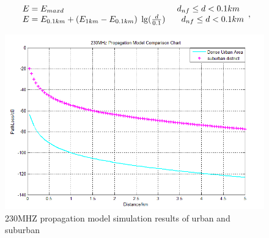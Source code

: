 \documentclass[12pt,a4paper,twocolumn,fleqn]{narms}
\begin{document}
{\begin{equation}
\begin{array}{l}
E = {E_{maxd}}{\kern 1pt} {\kern 1pt} {\kern 1pt} {\kern 1pt} {\kern 1pt} {\kern 1pt} {\kern 1pt} {\kern 1pt} {\kern 1pt} {\kern 1pt} {\kern 1pt} {\kern 1pt} {\kern 1pt} {\kern 1pt} {\kern 1pt} {\kern 1pt} {\kern 1pt} {\kern 1pt} {\kern 1pt} {\kern 1pt} {\kern 1pt} {\kern 1pt} {\kern 1pt} {\kern 1pt} {\kern 1pt} {\kern 1pt} {\kern 1pt} {\kern 1pt} {\kern 1pt} {\kern 1pt} {\kern 1pt} {\kern 1pt} {\kern 1pt} {\kern 1pt} {\kern 1pt} {\kern 1pt} {\kern 1pt} {\kern 1pt} {\kern 1pt} {\kern 1pt} {\kern 1pt} {\kern 1pt} {\kern 1pt} {\kern 1pt} {\kern 1pt} {\kern 1pt} {\kern 1pt} {\kern 1pt} {\kern 1pt} {\kern 1pt} {\kern 1pt} {\kern 1pt} {\kern 1pt} {\kern 1pt} {\kern 1pt} {\kern 1pt} {\kern 1pt} {\kern 1pt} {\kern 1pt} {\kern 1pt} {\kern 1pt} {\kern 1pt} {\kern 1pt} {\kern 1pt} {\kern 1pt} {\kern 1pt} {\kern 1pt} {\kern 1pt} {\kern 1pt} {\kern 1pt} {\kern 1pt} {\kern 1pt} {\kern 1pt} {\kern 1pt} {\kern 1pt} {\kern 1pt} {\kern 1pt} {\kern 1pt} {\kern 1pt} {\kern 1pt} {\kern 1pt} {\kern 1pt} {\kern 1pt} {\kern 1pt} {\kern 1pt} {\kern 1pt} {\kern 1pt} {\kern 1pt} {\kern 1pt} {\kern 1pt} {\kern 1pt} {\kern 1pt} {\kern 1pt} {\kern 1pt} {\kern 1pt} {\kern 1pt} {\kern 1pt} {\kern 1pt} {\kern 1pt} {\kern 1pt} {\kern 1pt} {\kern 1pt} {\kern 1pt} {\kern 1pt} {\kern 1pt} {\kern 1pt} {\kern 1pt} {\kern 1pt} {\kern 1pt} {\kern 1pt} {\kern 1pt} {\kern 1pt} {\kern 1pt} {\kern 1pt} {\kern 1pt} {\kern 1pt} {\kern 1pt} {\kern 1pt} {\kern 1pt} {\kern 1pt} {\kern 1pt} {\kern 1pt} {\kern 1pt} {\kern 1pt} {\kern 1pt} {\kern 1pt} {\kern 1pt} {\kern 1pt} {\kern 1pt} {\kern 1pt} {\kern 1pt} {\kern 1pt} {\kern 1pt} {\kern 1pt} {d_{nf}} \le d < 0.1km\\
E = {E_{0.1km}} + ({E_{1km}} - {E_{0.1km}}){\kern 1pt} {\kern 1pt} {\kern 1pt} \lg (\frac{d}{{0.1}}){\kern 1pt} {\kern 1pt} {\kern 1pt} {\kern 1pt} {\kern 1pt} {\kern 1pt} {\kern 1pt} {\kern 1pt} {\kern 1pt} {\kern 1pt} {\kern 1pt} {\kern 1pt} {\kern 1pt} {\kern 1pt} {\kern 1pt} {\kern 1pt} {\kern 1pt} {\kern 1pt} {\kern 1pt} {d_{nf}} \le d < 0.1km
\end{array}, \label{keurough} \end{equation}

\begin{figure}
\centerline{\includegraphics[width=15cm]{urbancountry.png}}
\caption{230MHZ propagation model simulation results of urban and suburban }
\end{figure}

}
\end{document}
